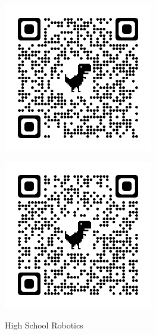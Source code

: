 \documentclass[letterpaper,10pt]{article}
\begin{document}
\begin{center}
    \begin{minipage}{0.45\textwidth}
        \centering
        \includegraphics[width=6.5cm, height=6.5cm]{Figures/DEWBOTXVII.png}
        \label{fig:image5}
    \end{minipage}
    \hspace{0.05\textwidth}
    \begin{minipage}{0.45\textwidth}
        \centering
        \includegraphics[width=6.5cm, height=6.5cm]{Figures/VEX.png}
        \label{fig:image6}
    \end{minipage}
    High School Robotics

  \end{center}
\end{document}
